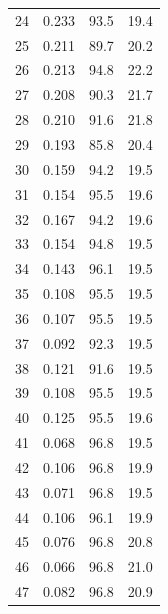 \begin{longtable}{rrrr}
24 & 0.233 & 93.5 & 19.4\\
25 & 0.211 & 89.7 & 20.2\\
26 & 0.213 & 94.8 & 22.2\\
27 & 0.208 & 90.3 & 21.7\\
28 & 0.210 & 91.6 & 21.8\\
29 & 0.193 & 85.8 & 20.4\\
30 & 0.159 & 94.2 & 19.5\\
31 & 0.154 & 95.5 & 19.6\\
32 & 0.167 & 94.2 & 19.6\\
33 & 0.154 & 94.8 & 19.5\\
34 & 0.143 & 96.1 & 19.5\\
35 & 0.108 & 95.5 & 19.5\\
36 & 0.107 & 95.5 & 19.5\\
37 & 0.092 & 92.3 & 19.5\\
38 & 0.121 & 91.6 & 19.5\\
39 & 0.108 & 95.5 & 19.5\\
40 & 0.125 & 95.5 & 19.6\\
41 & 0.068 & 96.8 & 19.5\\
42 & 0.106 & 96.8 & 19.9\\
43 & 0.071 & 96.8 & 19.5\\
44 & 0.106 & 96.1 & 19.9\\
45 & 0.076 & 96.8 & 20.8\\
46 & 0.066 & 96.8 & 21.0\\
47 & 0.082 & 96.8 & 20.9\\
\bottomrule\end{longtable}

